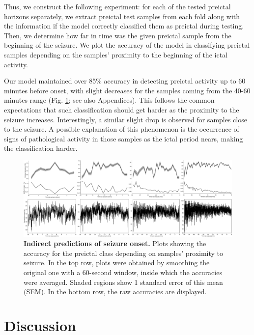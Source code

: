 \documentclass[a4paper,fleqn]{cas-sc}
\begin{document}
Thus, we construct the following experiment: for each of the tested preictal horizons separately, we extract preictal test samples from each fold along with the information if the model correctly classified them as preictal during testing. Then, we determine how far in time was the given preictal sample from the beginning of the seizure. We plot the accuracy of the model in classifying preictal samples depending on the samples' proximity to the beginning of the ictal activity.

Our model maintained over 85\% accuracy in detecting preictal activity up to 60 minutes before onset, with slight decreases for the samples coming from the 40-60 minutes range (Fig. \ref{fig:predictive-horizon}; see also Appendices). This follows the common expectations that such classification should get harder as the proximity to the seizure increases. Interestingly, a similar slight drop is observed for samples close to the seizure. A possible explanation of this phenomenon is the occurrence of signs of pathological activity in those samples as the ictal period nears, making the classification harder.

\begin{figure}
    \centering
    \includegraphics[width=\linewidth]{figures/Fig4.pdf}
    \caption{\textbf{Indirect predictions of seizure onset.} Plots showing the accuracy for the preictal class depending on samples' proximity to seizure. In the top row, plots were obtained by smoothing the original one with a 60-second window, inside which the accuracies were averaged. Shaded regions show 1 standard error of this mean (SEM). In the bottom row, the raw accuracies are displayed.}
    \label{fig:predictive-horizon}
\end{figure}

\section{Discussion}
\end{document}
